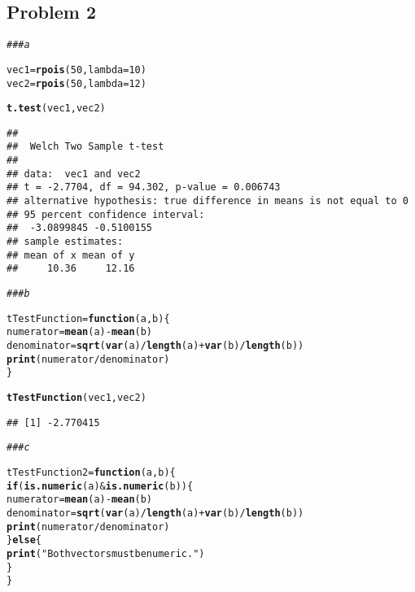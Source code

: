 \documentclass[12pt,letter]{article}\usepackage[]{graphicx}\usepackage[]{color}
\makeatletter
\newcommand{\hlnum}[1]{\textcolor[rgb]{0.686,0.059,0.569}{#1}}%
\newcommand{\hlstr}[1]{\textcolor[rgb]{0.192,0.494,0.8}{#1}}%
\newcommand{\hlcom}[1]{\textcolor[rgb]{0.678,0.584,0.686}{\textit{#1}}}%
\newcommand{\hlopt}[1]{\textcolor[rgb]{0,0,0}{#1}}%
\newcommand{\hlstd}[1]{\textcolor[rgb]{0.345,0.345,0.345}{#1}}%
\newcommand{\hlkwa}[1]{\textcolor[rgb]{0.161,0.373,0.58}{\textbf{#1}}}%
\newcommand{\hlkwb}[1]{\textcolor[rgb]{0.69,0.353,0.396}{#1}}%
\newcommand{\hlkwc}[1]{\textcolor[rgb]{0.333,0.667,0.333}{#1}}%
\newcommand{\hlkwd}[1]{\textcolor[rgb]{0.737,0.353,0.396}{\textbf{#1}}}%
\newenvironment{kframe}{%
 \def\at@end@of@kframe{}%
 \ifinner\ifhmode%
  \def\at@end@of@kframe{\end{minipage}}%
  \begin{minipage}{\columnwidth}%
 \fi\fi%
 \def\FrameCommand##1{\hskip\@totalleftmargin \hskip-\fboxsep
 \colorbox{shadecolor}{##1}\hskip-\fboxsep
     \hskip-\linewidth \hskip-\@totalleftmargin \hskip\columnwidth}%
 \MakeFramed {\advance\hsize-\width
   \@totalleftmargin\z@ \linewidth\hsize
   \@setminipage}}%
 {\par\unskip\endMakeFramed%
 \at@end@of@kframe}
\newenvironment{knitrout}{}{} %
\makeatother
\begin{document}
\subsection*{Problem 2}

\begin{knitrout}
\color{fgcolor}\begin{kframe}
\begin{alltt}
\hlcom{### a}

\hlstd{vec1} \hlkwb{=} \hlkwd{rpois}\hlstd{(}\hlnum{50}\hlstd{,} \hlkwc{lambda} \hlstd{=} \hlnum{10}\hlstd{)}
\hlstd{vec2} \hlkwb{=} \hlkwd{rpois}\hlstd{(}\hlnum{50}\hlstd{,} \hlkwc{lambda} \hlstd{=} \hlnum{12}\hlstd{)}

\hlkwd{t.test}\hlstd{(vec1, vec2)}
\end{alltt}
\begin{verbatim}
## 
## 	Welch Two Sample t-test
## 
## data:  vec1 and vec2
## t = -2.7704, df = 94.302, p-value = 0.006743
## alternative hypothesis: true difference in means is not equal to 0
## 95 percent confidence interval:
##  -3.0899845 -0.5100155
## sample estimates:
## mean of x mean of y 
##     10.36     12.16
\end{verbatim}
\begin{alltt}
\hlcom{### b}

\hlstd{tTestFunction} \hlkwb{=} \hlkwa{function}\hlstd{(}\hlkwc{a}\hlstd{,} \hlkwc{b}\hlstd{) \{}
    \hlstd{numerator} \hlkwb{=} \hlkwd{mean}\hlstd{(a)} \hlopt{-} \hlkwd{mean}\hlstd{(b)}
    \hlstd{denominator} \hlkwb{=} \hlkwd{sqrt}\hlstd{(}\hlkwd{var}\hlstd{(a)}\hlopt{/}\hlkwd{length}\hlstd{(a)} \hlopt{+} \hlkwd{var}\hlstd{(b)}\hlopt{/}\hlkwd{length}\hlstd{(b))}
    \hlkwd{print}\hlstd{(numerator}\hlopt{/}\hlstd{denominator)}
\hlstd{\}}

\hlkwd{tTestFunction}\hlstd{(vec1, vec2)}
\end{alltt}
\begin{verbatim}
## [1] -2.770415
\end{verbatim}
\begin{alltt}
\hlcom{### c}

\hlstd{tTestFunction2} \hlkwb{=} \hlkwa{function}\hlstd{(}\hlkwc{a}\hlstd{,} \hlkwc{b}\hlstd{) \{}
    \hlkwa{if} \hlstd{(}\hlkwd{is.numeric}\hlstd{(a)} \hlopt{&} \hlkwd{is.numeric}\hlstd{(b)) \{}
        \hlstd{numerator} \hlkwb{=} \hlkwd{mean}\hlstd{(a)} \hlopt{-} \hlkwd{mean}\hlstd{(b)}
        \hlstd{denominator} \hlkwb{=} \hlkwd{sqrt}\hlstd{(}\hlkwd{var}\hlstd{(a)}\hlopt{/}\hlkwd{length}\hlstd{(a)} \hlopt{+} \hlkwd{var}\hlstd{(b)}\hlopt{/}\hlkwd{length}\hlstd{(b))}
        \hlkwd{print}\hlstd{(numerator}\hlopt{/}\hlstd{denominator)}
    \hlstd{\}} \hlkwa{else} \hlstd{\{}
        \hlkwd{print}\hlstd{(}\hlstr{"Both vectors must be numeric."}\hlstd{)}
    \hlstd{\}}
\hlstd{\}}
\end{alltt}
\end{kframe}
\end{knitrout}
\end{document}
